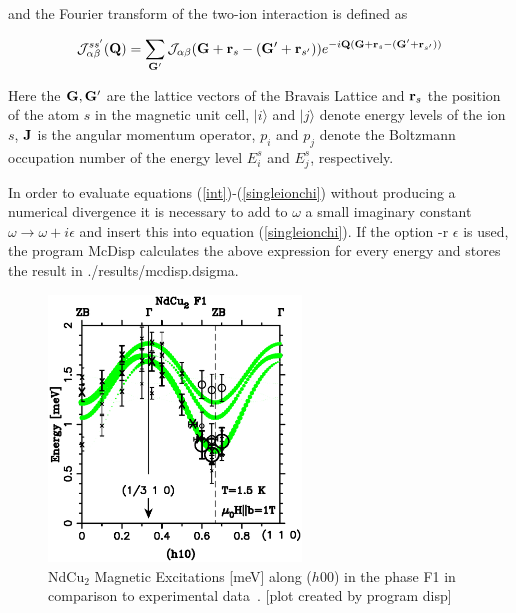 and the Fourier transform of the two-ion interaction is defined as

\begin{equation}
{\mathcal J}_{\alpha\beta}^{ss'}({\mbf Q})=\sum_{\mbf G'} {\mathcal J}_{\alpha\beta}(\mbf G+\mbf r_s-(\mbf G'+\mbf %
r_{s'})) e^{-i\mbf Q(\mbf G+\mbf r_s-(\mbf G'+\mbf r_{s'}))}
\end{equation}

Here the $\mathbf G,\mathbf G'$ are the lattice vectors of the Bravais Lattice and 
$\mathbf r_s$ the position of the atom $s$ in the magnetic unit cell,
 $|i\rangle$ and $|j\rangle$ denote energy levels of the ion
$s$, $\mathbf J$ is the angular momentum operator,
$p_i$ and $p_j$ denote the Boltzmann occupation number of the
energy level $E^s_i$ and $E^s_j$, respectively.


In order to evaluate
 equations
(\ref{int})-(\ref{singleionchi}) without producing a numerical divergence 
it is necessary to add to $\omega$ a small imaginary constant $\omega \rightarrow \omega+i\epsilon$
and insert this into equation (\ref{singleionchi}). 
If the option {\prg -r $\epsilon$} is used,
the program {\prg McDisp} calculates the above expression for every energy
and stores the result in {\prg ./results/mcdisp.dsigma}. 


\begin{figure}[tb]%
\begin{center}\leavevmode
\includegraphics[angle=0, width=0.6\textwidth]{figsrc/dispF1.ps}
\end{center}
\caption{\label{dispF1}NdCu$_2$ Magnetic Excitations [meV] along ($h$00) in the phase F1 in comparison to experimental %
data~\cite{rotter02-751}.
[plot created by program {\prg disp}]}
\end{figure}

